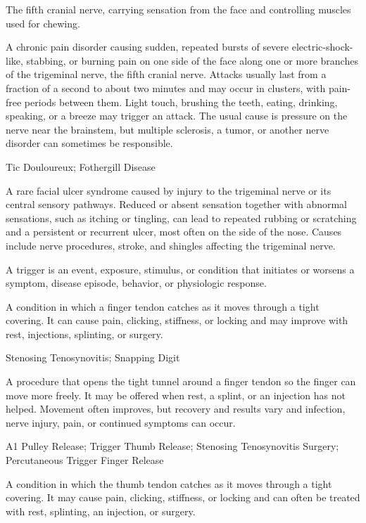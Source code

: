  The fifth cranial nerve, carrying sensation from the face and controlling muscles used for chewing.

 A chronic pain disorder causing sudden, repeated bursts of severe electric-shock-like, stabbing, or burning pain on one side of the face along one or more branches of the trigeminal nerve, the fifth cranial nerve. Attacks usually last from a fraction of a second to about two minutes and may occur in clusters, with pain-free periods between them. Light touch, brushing the teeth, eating, drinking, speaking, or a breeze may trigger an attack. The usual cause is pressure on the nerve near the brainstem, but multiple sclerosis, a tumor, or another nerve disorder can sometimes be responsible.

\synonyms
Tic Douloureux; Fothergill Disease

 A rare facial ulcer syndrome caused by injury to the trigeminal nerve or its central sensory pathways. Reduced or absent sensation together with abnormal sensations, such as itching or tingling, can lead to repeated rubbing or scratching and a persistent or recurrent ulcer, most often on the side of the nose. Causes include nerve procedures, stroke, and shingles affecting the trigeminal nerve.

 A trigger is an event, exposure, stimulus, or condition that initiates or worsens a symptom, disease episode, behavior, or physiologic response.

 A condition in which a finger tendon catches as it moves through a tight covering. It can cause pain, clicking, stiffness, or locking and may improve with rest, injections, splinting, or surgery.

\synonyms
Stenosing Tenosynovitis; Snapping Digit

 A procedure that opens the tight tunnel around a finger tendon so the finger can move more freely. It may be offered when rest, a splint, or an injection has not helped. Movement often improves, but recovery and results vary and infection, nerve injury, pain, or continued symptoms can occur.

\synonyms
A1 Pulley Release; Trigger Thumb Release; Stenosing Tenosynovitis Surgery; Percutaneous Trigger Finger Release

 A condition in which the thumb tendon catches as it moves through a tight covering. It may cause pain, clicking, stiffness, or locking and can often be treated with rest, splinting, an injection, or surgery.

